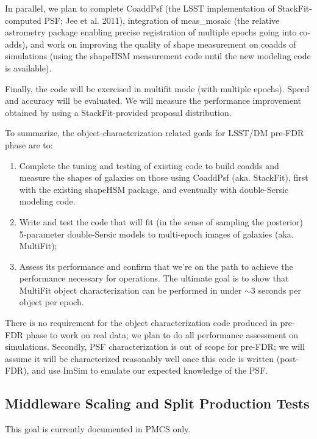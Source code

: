 \documentclass[12pt]{article}
\begin{document}
In parallel, we plan to complete CoaddPsf (the LSST implementation of
StackFit-computed PSF; Jee et al. 2011), integration of meas\_mosaic
(the relative astrometry package enabling precise registration
of multiple epochs going into co-adds), and work on improving the
quality of shape measurement on coadds of simulations (using the
shapeHSM measurement code until the new modeling code is available).

Finally, the code will be exercised in multifit mode (with multiple
epochs). Speed and accuracy will be evaluated. We will measure the
performance improvement obtained by using a StackFit-provided proposal
distribution.

To summarize, the object-characterization related goals for LSST/DM
pre-FDR phase are to:

\begin{enumerate}
\item Complete the tuning and testing of existing code to build coadds
         and measure the shapes of galaxies on those using CoaddPsf
         (aka. StackFit), first with the existing shapeHSM package, and
         eventually with double-Sersic modeling code.
\item Write and test the code that will fit (in the sense of sampling
         the posterior) 5-parameter double-Sersic models to multi-epoch
         images of galaxies (aka. MultiFit);
\item Assess its performance and confirm that we're on the path to
         achieve the performance necessary for operations. The ultimate
         goal is to show that MultiFit object characterization can be
         performed in under $\sim$3 seconds per object per epoch.
\end{enumerate}

There is no requirement for the object characterization code produced
in pre-FDR phase to work on real data; we plan to do all performance
assessment on simulations. Secondly, PSF characterization is out of
scope for pre-FDR; we will assume it will be characterized reasonably
well once this code is written (post-FDR), and use ImSim to emulate
our expected knowledge of the PSF.

\subsection{Middleware Scaling and Split Production Tests}

This goal is currently documented in PMCS only.
\end{document}
